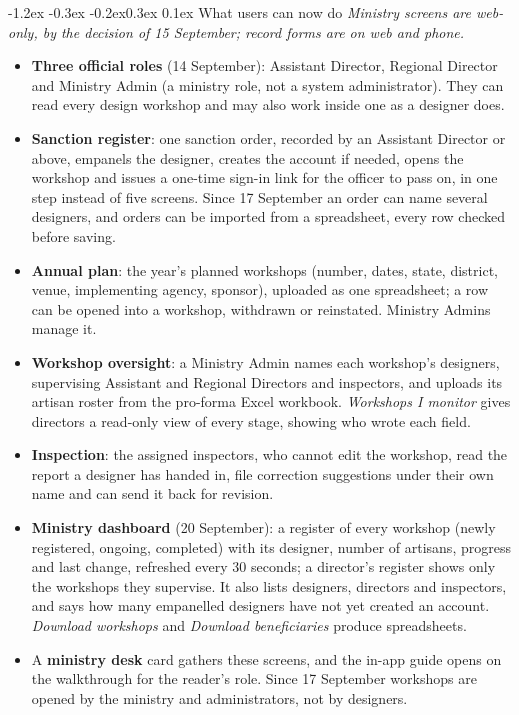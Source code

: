 \documentclass[10pt,a4paper]{article}
\makeatletter
\renewcommand\section{\@startsection{section}{1}{\z@}%
  {-1.2ex \@plus -0.3ex \@minus -0.2ex}{0.3ex \@plus 0.1ex}%
  {\normalfont\large\bfseries\color{accent}}}
\makeatother
\begin{document}
\section{What users can now do}
\emph{Ministry screens are web-only, by the decision of 15 September; record forms are on web and phone.}
\begin{itemize}
\item \textbf{Three official roles} (14 September): Assistant Director, Regional Director and Ministry Admin
  (a ministry role, not a system administrator). They can read every design workshop and may also work
  inside one as a designer does.
\item \textbf{Sanction register}: one sanction order, recorded by an Assistant Director or above, empanels the
  designer, creates the account if needed, opens the workshop and issues a one-time sign-in link for the
  officer to pass on, in one step instead of five screens. Since 17 September an order can name several
  designers, and orders can be imported from a spreadsheet, every row checked before saving.
\item \textbf{Annual plan}: the year's planned workshops (number, dates, state, district, venue, implementing
  agency, sponsor), uploaded as one spreadsheet; a row can be opened into a workshop, withdrawn or reinstated.
  Ministry Admins manage it.
\item \textbf{Workshop oversight}: a Ministry Admin names each workshop's designers, supervising Assistant and
  Regional Directors and inspectors, and uploads its artisan roster from the pro-forma Excel workbook.
  \emph{Workshops I monitor} gives directors a read-only view of every stage, showing who wrote each field.
\item \textbf{Inspection}: the assigned inspectors, who cannot edit the workshop, read the report a designer has
  handed in, file correction suggestions under their own name and can send it back for revision.
\item \textbf{Ministry dashboard} (20 September): a register of every workshop (newly registered, ongoing,
  completed) with its designer, number of artisans, progress and last change, refreshed every 30
  seconds; a director's register shows only the workshops they supervise. It also lists designers, directors
  and inspectors, and says how many empanelled designers have not yet created an account. \emph{Download workshops} and \emph{Download beneficiaries} produce spreadsheets.
\item A \textbf{ministry desk} card gathers these screens, and the in-app guide opens on the walkthrough for the
  reader's role. Since 17 September workshops are opened by the ministry and administrators, not by designers.
\end{itemize}
\end{document}

